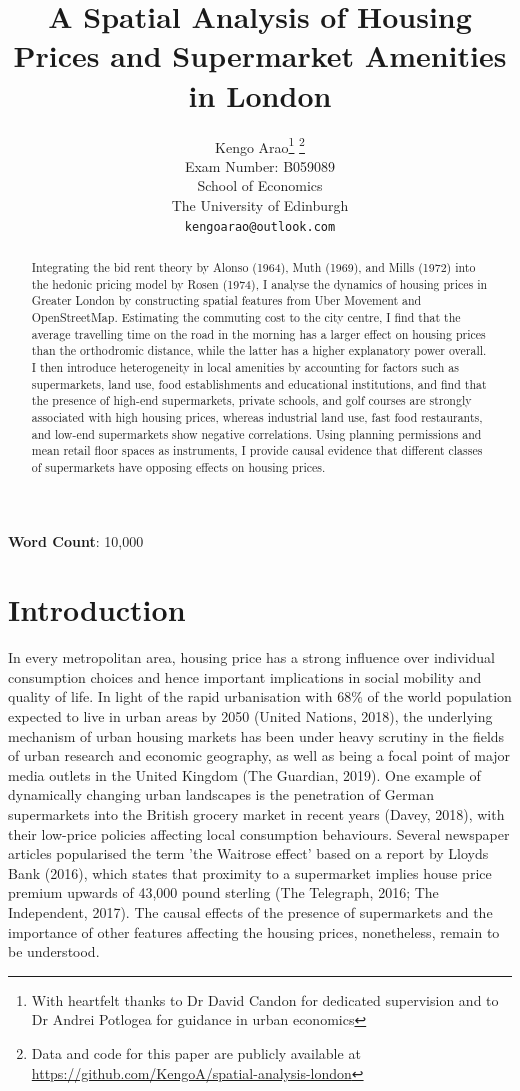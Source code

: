 \documentclass{article}
\title{A Spatial Analysis of Housing Prices and Supermarket Amenities in London}
\author{
  \large{Kengo Arao}\thanks{With heartfelt thanks to Dr David Candon for dedicated supervision and to Dr Andrei Potlogea for guidance in urban economics}      \thanks{Data and code for this paper are publicly available at \href{https://github.com/KengoA/spatial-analysis-london}{https://github.com/KengoA/spatial-analysis-london}} \\
  Exam Number: B059089 \\
  School of Economics\\
  The University of Edinburgh\\
  \texttt{kengoarao@outlook.com}
}
\begin{document}
\maketitle

\begin{abstract}
Integrating the bid rent theory by Alonso (1964), Muth (1969), and Mills (1972) into the hedonic pricing model by Rosen (1974), I analyse the dynamics of housing prices in Greater London by constructing spatial features from Uber Movement and OpenStreetMap. Estimating the commuting cost to the city centre, I find that the average travelling time on the road in the morning has a larger effect on housing prices than the orthodromic distance, while the latter has a higher explanatory power overall. I then introduce heterogeneity in local amenities by accounting for factors such as supermarkets, land use, food establishments and educational institutions, and find that the presence of high-end supermarkets, private schools, and golf courses are strongly associated with high housing prices, whereas industrial land use, fast food restaurants, and low-end supermarkets show negative correlations. Using planning permissions and mean retail floor spaces as instruments, I provide causal evidence that different classes of supermarkets have opposing effects on housing prices.

\end{abstract}

\begin{center}
    \textbf{Word Count}: 10,000
\end{center}

\newpage
\tableofcontents

\newpage
\section{Introduction} \label{section:intro}
In every metropolitan area, housing price has a strong influence over individual consumption choices and hence important implications in social mobility and quality of life. In light of the rapid urbanisation with 68\% of the world population expected to live in urban areas by 2050 (United Nations, 2018), the underlying mechanism of urban housing markets has been under heavy scrutiny in the fields of urban research and economic geography, as well as being a focal point of major media outlets in the United Kingdom (The Guardian, 2019). One example of dynamically changing urban landscapes is the penetration of German supermarkets into the British grocery market in recent years (Davey, 2018), with their low-price policies affecting local consumption behaviours. Several newspaper articles popularised the term 'the Waitrose effect' based on a report by Lloyds Bank (2016), which states that proximity to a supermarket implies house price premium upwards of 43,000 pound sterling (The Telegraph, 2016; The Independent, 2017). The causal effects of the presence of supermarkets and the importance of other features affecting the housing prices, nonetheless, remain to be understood.
 
\end{document}
